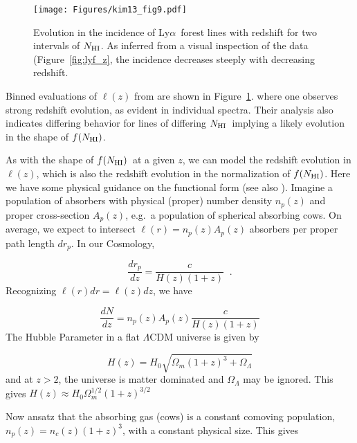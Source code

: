 \documentclass[graybox]{svmult}
\def\lya{Ly$\alpha$}
\newcommand{\mnhi}{N_{\rm HI}}
\newcommand{\nhi}{$\mnhi$}
\def\mfnhi{f(\mnhi)}
\def\fnhi{$\mfnhi$}
\begin{document}
%
\begin{figure}[b]
\sidecaption
\texttt{[image: Figures/kim13\_fig9.pdf]}
%
%
\caption{Evolution in the incidence of \lya\ forest lines
with redshift for two intervals of \nhi.  As inferred from a visual
inspection of the data (Figure~\ref{fig:lyf_z}, 
the incidence decreases steeply with decreasing redshift.
}
\label{fig:kim13_loz}       %
\end{figure}


Binned evaluations of $\ell(z)$ from \cite{kim13}
are shown in Figure~\ref{fig:kim13_loz}.
where one observes strong redshift evolution, 
as evident in individual spectra.
Their analysis also indicates differing behavior
for lines of differing \nhi\ implying a likely
evolution in the shape of \fnhi.

As with the shape of \fnhi\ at a given $z$,
we can model the redshift evolution in $\ell(z)$,
which is also the redshift evolution in the
normalization of \fnhi.  Here we have some
physical guidance on the functional form
(see also \cite{meiksin09}).
Imagine a population of absorbers with physical (proper)
number density $n_p(z)$ and proper cross-section $A_p(z)$,
e.g.\ a population of spherical absorbing cows.
On average, we expect to intersect
$\ell(r) = n_p(z) A_p(z)$ absorbers per proper path length $d r_p$.
In our Cosmology,

\begin{equation}
\frac{dr_p}{dz} = \frac{c}{H(z) (1+z)} \;\; .
\label{eqn:drdz}
\end{equation}
Recognizing $\ell(r) dr = \ell(z) dz$, we have

\begin{equation}
\frac{dN}{dz} = n_p(z) A_p(z) \frac{c}{H(z) (1+z)}
\end{equation}
The Hubble Parameter in a flat $\Lambda$CDM universe
is given by

\begin{equation}
H(z) = H_0 \sqrt{\Omega_m (1+z)^3 + \Omega_\Lambda}
\end{equation}
and at $z>2$, the universe is matter dominated and 
$\Omega_\Lambda$ may be ignored.  This gives
$H(z) \approx H_0 \Omega_m^{1/2} (1+z)^{3/2}$

Now ansatz that the absorbing gas (cows) is
a constant comoving population, 
$n_p(z) = n_c(z) (1+z)^{3}$, with a constant
physical size.  This gives
\end{document}
